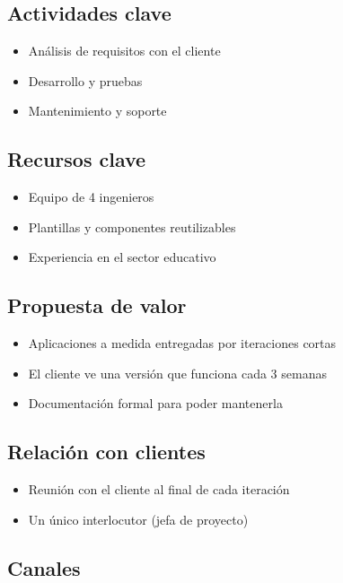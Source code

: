 \documentclass[11pt,a4paper]{article}
\begin{document}
\subsection*{Actividades clave}

\begin{itemize}
\item Análisis de requisitos con el cliente
\item Desarrollo y pruebas
\item Mantenimiento y soporte
\end{itemize}

\subsection*{Recursos clave}

\begin{itemize}
\item Equipo de 4 ingenieros
\item Plantillas y componentes reutilizables
\item Experiencia en el sector educativo
\end{itemize}

\subsection*{Propuesta de valor}

\begin{itemize}
\item Aplicaciones a medida entregadas por iteraciones cortas
\item El cliente ve una versión que funciona cada 3 semanas
\item Documentación formal para poder mantenerla
\end{itemize}

\subsection*{Relación con clientes}

\begin{itemize}
\item Reunión con el cliente al final de cada iteración
\item Un único interlocutor (jefa de proyecto)
\end{itemize}

\subsection*{Canales}
\end{document}
